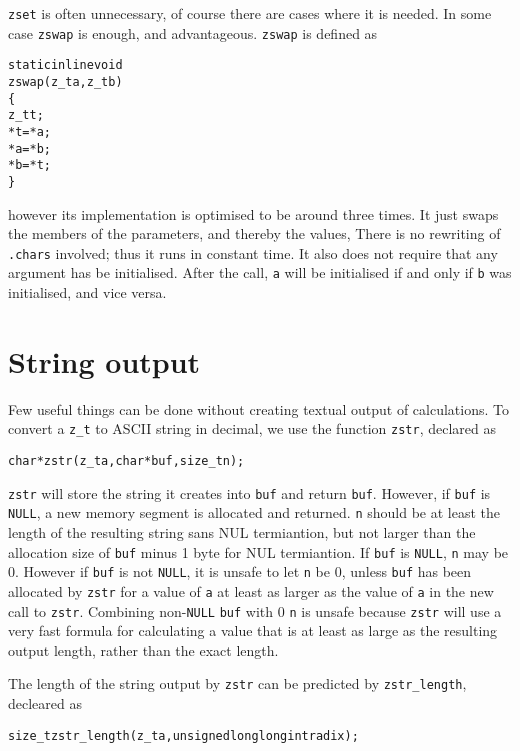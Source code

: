 {\tt zset} is often unnecessary, of course
there are cases where it is needed. In some case
{\tt zswap} is enough, and advantageous.
{\tt zswap} is defined as

\begin{alltt}
   \textcolor{c}{static inline} void
   zswap(z_t a, z_t b)
   \{
       z_t t;
       *t = *a;
       *a = *b;
       *b = *t;
   \}
\end{alltt}

\noindent
however its implementation is optimised to be
around three times. It just swaps the members
of the parameters, and thereby the values, There
is no rewriting of {\tt .chars} involved; thus
it runs in constant time. It also does not
require that any argument has be initialised.
After the call, {\tt a} will be initialised
if and only if {\tt b} was initialised, and
vice versa.


\newpage
\section{String output}
\label{sec:String output}

Few useful things can be done without creating
textual output of calculations. To convert a
{\tt z\_t} to ASCII string in decimal, we use the
function {\tt zstr}, declared as

\begin{alltt}
   char *zstr(z_t a, char *buf, size_t n);
\end{alltt}

\noindent
{\tt zstr} will store the string it creates into
{\tt buf} and return {\tt buf}. However, if {\tt buf}
is {\tt NULL}, a new memory segment is allocated
and returned. {\tt n} should be at least the length
of the resulting string sans NUL termiantion, but
not larger than the allocation size of {\tt buf}
minus 1 byte for NUL termiantion. If {\tt buf} is
{\tt NULL}, {\tt n} may be 0. However if {\tt buf}
is not {\tt NULL}, it is unsafe to let {\tt n} be
0, unless {\tt buf} has been allocated by {\tt zstr}
for a value of {\tt a} at least as larger as the
value of {\tt a} in the new call to {\tt zstr}.
Combining non-\texttt{NULL} {\tt buf} with 0 {\tt n}
is unsafe because {\tt zstr} will use a very fast
formula for calculating a value that is at least
as large as the resulting output length, rather
than the exact length.

The length of the string output by {\tt zstr} can
be predicted by {\tt zstr\_length}, decleared as

\begin{alltt}
   size_t zstr_length(z_t a, unsigned long long int radix);
\end{alltt}

